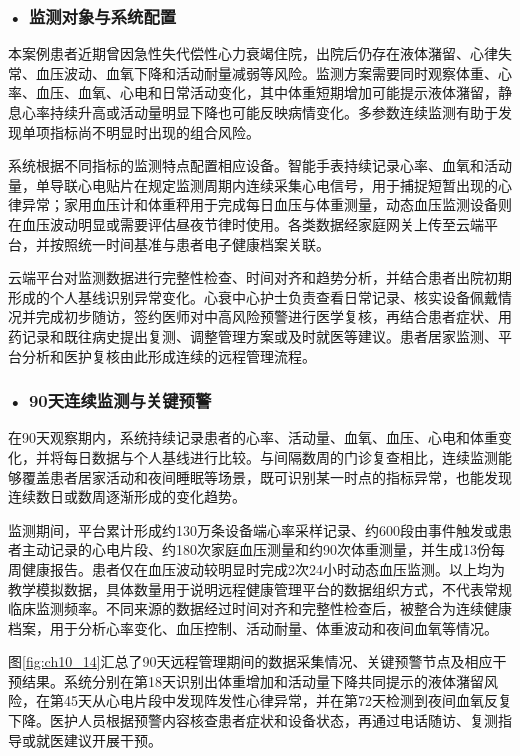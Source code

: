 \subsubsection*{\textbf{• 监测对象与系统配置}}

本案例患者近期曾因急性失代偿性心力衰竭住院，出院后仍存在液体潴留、心律失常、血压波动、血氧下降和活动耐量减弱等风险。监测方案需要同时观察体重、心率、血压、血氧、心电和日常活动变化，其中体重短期增加可能提示液体潴留，静息心率持续升高或活动量明显下降也可能反映病情变化。多参数连续监测有助于发现单项指标尚不明显时出现的组合风险。

系统根据不同指标的监测特点配置相应设备。智能手表持续记录心率、血氧和活动量，单导联心电贴片在规定监测周期内连续采集心电信号，用于捕捉短暂出现的心律异常；家用血压计和体重秤用于完成每日血压与体重测量，动态血压监测设备则在血压波动明显或需要评估昼夜节律时使用。各类数据经家庭网关上传至云端平台，并按照统一时间基准与患者电子健康档案关联。

云端平台对监测数据进行完整性检查、时间对齐和趋势分析，并结合患者出院初期形成的个人基线识别异常变化。心衰中心护士负责查看日常记录、核实设备佩戴情况并完成初步随访，签约医师对中高风险预警进行医学复核，再结合患者症状、用药记录和既往病史提出复测、调整管理方案或及时就医等建议。患者居家监测、平台分析和医护复核由此形成连续的远程管理流程。

\subsubsection*{\textbf{• 90天连续监测与关键预警}}

在90天观察期内，系统持续记录患者的心率、活动量、血氧、血压、心电和体重变化，并将每日数据与个人基线进行比较。与间隔数周的门诊复查相比，连续监测能够覆盖患者居家活动和夜间睡眠等场景，既可识别某一时点的指标异常，也能发现连续数日或数周逐渐形成的变化趋势。

监测期间，平台累计形成约130万条设备端心率采样记录、约600段由事件触发或患者主动记录的心电片段、约180次家庭血压测量和约90次体重测量，并生成13份每周健康报告。患者仅在血压波动较明显时完成2次24小时动态血压监测。以上均为教学模拟数据，具体数量用于说明远程健康管理平台的数据组织方式，不代表常规临床监测频率。不同来源的数据经过时间对齐和完整性检查后，被整合为连续健康档案，用于分析心率变化、血压控制、活动耐量、体重波动和夜间血氧等情况。

图\ref{fig:ch10_14}汇总了90天远程管理期间的数据采集情况、关键预警节点及相应干预结果。系统分别在第18天识别出体重增加和活动量下降共同提示的液体潴留风险，在第45天从心电片段中发现阵发性心律异常，并在第72天检测到夜间血氧反复下降。医护人员根据预警内容核查患者症状和设备状态，再通过电话随访、复测指导或就医建议开展干预。


